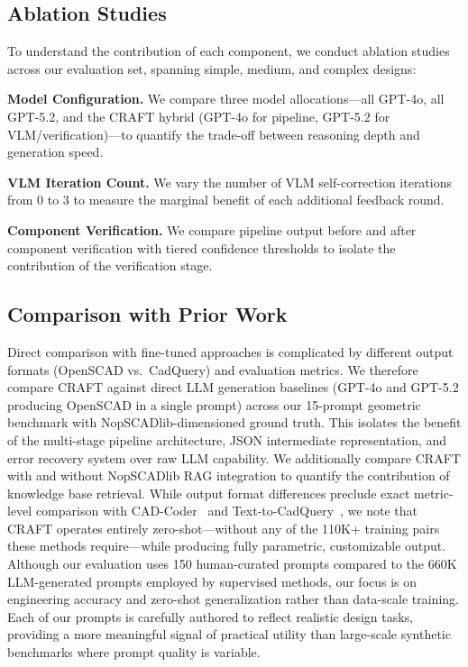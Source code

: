 \documentclass[5p,twocolumn,10pt,times]{elsarticle}
\begin{document}
\subsection{Ablation Studies}

To understand the contribution of each component, we conduct ablation studies across our evaluation set, spanning simple, medium, and complex designs:

\textbf{Model Configuration.} We compare three model allocations---all GPT-4o, all GPT-5.2, and the CRAFT hybrid (GPT-4o for pipeline, GPT-5.2 for VLM/verification)---to quantify the trade-off between reasoning depth and generation speed.

\textbf{VLM Iteration Count.} We vary the number of VLM self-correction iterations from 0 to 3 to measure the marginal benefit of each additional feedback round.

\textbf{Component Verification.} We compare pipeline output before and after component verification with tiered confidence thresholds to isolate the contribution of the verification stage.

\subsection{Comparison with Prior Work}

Direct comparison with fine-tuned approaches is complicated by different output formats (OpenSCAD vs.\ CadQuery) and evaluation metrics. We therefore compare CRAFT against direct LLM generation baselines (GPT-4o and GPT-5.2 producing OpenSCAD in a single prompt) across our 15-prompt geometric benchmark with NopSCADlib-dimensioned ground truth. This isolates the benefit of the multi-stage pipeline architecture, JSON intermediate representation, and error recovery system over raw LLM capability. We additionally compare CRAFT with and without NopSCADlib RAG integration to quantify the contribution of knowledge base retrieval. While output format differences preclude exact metric-level comparison with CAD-Coder~\cite{cadcoder2025} and Text-to-CadQuery~\cite{text2cadquery2025}, we note that CRAFT operates entirely zero-shot---without any of the 110K+ training pairs these methods require---while producing fully parametric, customizable output. Although our evaluation uses 150 human-curated prompts compared to the 660K LLM-generated prompts employed by supervised methods, our focus is on engineering accuracy and zero-shot generalization rather than data-scale training. Each of our prompts is carefully authored to reflect realistic design tasks, providing a more meaningful signal of practical utility than large-scale synthetic benchmarks where prompt quality is variable.
\end{document}
